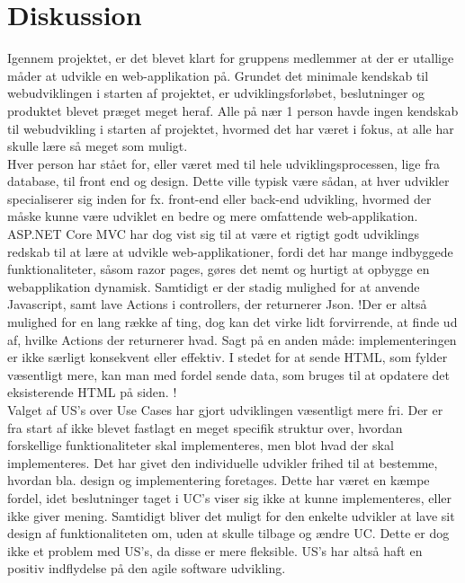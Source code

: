 \chapter{Diskussion}
Igennem projektet, er det blevet klart for gruppens medlemmer at der er utallige måder at udvikle en web-applikation på. Grundet det minimale kendskab til webudviklingen i starten af projektet, er udviklingsforløbet, beslutninger og produktet blevet præget meget heraf. Alle på nær 1 person havde ingen kendskab til webudvikling i starten af projektet, hvormed det har været i fokus, at alle har skulle lære så meget som muligt.\\
Hver person har stået for, eller været med til hele udviklingsprocessen, lige fra database, til front end og design. Dette ville typisk være sådan, at hver udvikler specialiserer sig inden for fx. front-end eller back-end udvikling, hvormed der måske kunne være udviklet en bedre og mere omfattende web-applikation. ASP.NET Core MVC har dog vist sig til at være et rigtigt godt udviklings redskab til at lære at udvikle web-applikationer, fordi det har mange indbyggede funktionaliteter, såsom razor pages, gøres det nemt og hurtigt at opbygge en webapplikation dynamisk. Samtidigt er der stadig mulighed for at anvende Javascript, samt lave Actions i controllers, der returnerer Json. !Der er altså mulighed for en lang række af ting, dog kan det virke lidt forvirrende, at finde ud af, hvilke Actions der returnerer hvad. Sagt på en anden måde: implementeringen er ikke særligt konsekvent eller effektiv. I stedet for at sende HTML, som fylder væsentligt mere, kan man med fordel sende data, som bruges til at opdatere det eksisterende HTML på siden. !  \\

\noindent Valget af US's over Use Cases har gjort udviklingen væsentligt mere fri. Der er fra start af ikke blevet fastlagt en meget specifik struktur over, hvordan forskellige funktionaliteter skal implementeres, men blot hvad der skal implementeres. Det har givet den individuelle udvikler frihed til at bestemme, hvordan bla. design og implementering foretages. Dette har været en kæmpe fordel, idet beslutninger taget i UC's viser sig ikke at kunne implementeres, eller ikke giver mening. Samtidigt bliver det muligt for den enkelte udvikler at lave sit design af funktionaliteten om, uden at skulle tilbage og ændre UC. Dette er dog ikke et problem med US's, da disse er mere fleksible. US's har altså haft en positiv indflydelse på den agile software udvikling. \\

